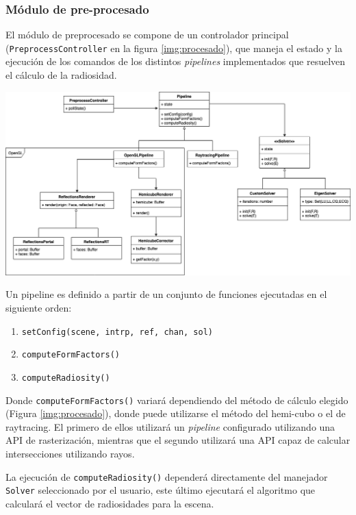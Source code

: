 \subsubsection{Módulo de pre-procesado}

El módulo de preprocesado se compone de un controlador principal (\verb|PreprocessController| en la figura \ref{img:procesado}), que maneja el estado y la ejecución de  los comandos de los distintos \textit{pipelines} implementados que resuelven el cálculo de la radiosidad.

\vspace{5mm}
\begin{minipage}[h]{\linewidth}
	\centering
	\includegraphics[width=\linewidth]{assets/preprocess}
	\label{img:procesado}
\end{minipage}

Un pipeline es definido a partir de un conjunto de funciones ejecutadas en el siguiente orden:

\begin{enumerate}
	\item \verb|setConfig(scene, intrp, ref, chan, sol)|
	\item \verb|computeFormFactors()|
	\item \verb|computeRadiosity()|
\end{enumerate}

Donde \verb|computeFormFactors()| variará dependiendo del método de cálculo elegido (Figura \ref{img:procesado}), donde puede utilizarse el método del hemi-cubo o el de raytracing. El primero de ellos utilizará un \textit{pipeline} configurado utilizando una API de rasterización, mientras que el segundo utilizará una API capaz de calcular intersecciones utilizando rayos.

La ejecución de \verb|computeRadiosity()| dependerá directamente del manejador \verb|Solver| seleccionado por el usuario, este último ejecutará el algoritmo que calculará el vector de radiosidades para la escena.

